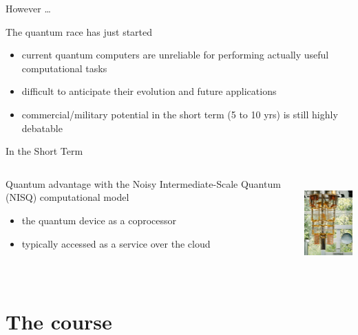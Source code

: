 \documentclass{beamer}
\begin{document}
\begin{frame}{However \dots}

        The quantum race has just started
        
        \begin{itemize}
                \item current quantum computers are \alert{unreliable}
                        for performing actually useful computational
                        tasks
                \item difficult to anticipate 
                        their  evolution and future applications
                \item commercial/military potential in the short term (5 to 10 yrs) 
                        is still highly debatable
        \end{itemize}
\end{frame}

\begin{frame}{In the Short Term}
  \begin{minipage}[0.3\textheight]{\textwidth}
  \begin{columns}[c]
  \begin{column}{0.7\textwidth}
        Quantum advantage with the \alert{Noisy Intermediate-Scale Quantum}
        (NISQ) computational model 
        \begin{itemize}
                \item the quantum device as a coprocessor
                \item typically accessed as a service over the cloud 
        \end{itemize}
  \end{column}
  \begin{column}{0.3\textwidth}
        \includegraphics[height=3.5cm]{./images/qc.jpg} 
  \end{column}
  \end{columns}
  \end{minipage}
\end{frame}

\section{The course}
\end{document}
